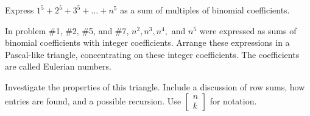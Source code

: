 \documentclass[10pt,]{book}
\theoremstyle{plain}
\theoremstyle{definition}
\theoremstyle{definition}
\theoremstyle{definition}
\theoremstyle{definition}
\numberwithin{equation}{chapter}
\begin{document}
\begin{divisionexercise}{9}\hypertarget{exercise-164}{}
\hypertarget{p-1333}{}%
Express \(1^{5} + 2^{5} + 3^{5} + \ldots + n^{5}\) as a sum of multiples of binomial coefficients.%
\end{divisionexercise}%
\begin{divisionexercise}{10}\hypertarget{exercise-165}{}
\hypertarget{p-1334}{}%
In problem \#1, \#2, \#5, and \#7, \(n^{2},n^{3},n^{4},\) and \(n^{5}\) were expressed as sums of binomial coefficients with integer coefficients. Arrange these expressions in a Pascal-like triangle, concentrating on these integer coefficients. The coefficients are called Eulerian numbers.%
\end{divisionexercise}%
\begin{divisionexercise}{11}\hypertarget{exercise-166}{}
\hypertarget{p-1335}{}%
Investigate the properties of this triangle. Include a discussion of row sums, how entries are found, and a possible recursion. Use \(\begin{bmatrix}
n\\
k
\end{bmatrix}\) for notation.%
\end{divisionexercise}%
\typeout{************************************************}
\typeout{************************************************}
\end{document}
